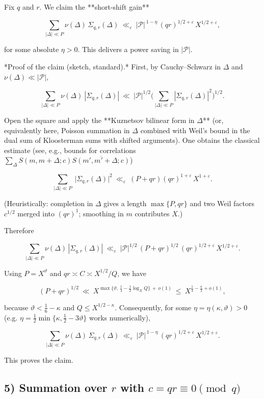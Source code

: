 \documentclass[11pt]{article}
\theoremstyle{definition}
\theoremstyle{remark}
\begin{document}
Fix $q$ and $r$. We claim the **short-shift gain**

$$
\sum_{|\Delta|\ll P}\nu(\Delta)\,\Sigma_{q,r}(\Delta)
\ \ll_\varepsilon\ |\mathcal P|^{\,1-\eta}\, (qr)^{1/2+\varepsilon}\,X^{1/2+\varepsilon},
$$

for some absolute $\eta>0$. This delivers a power saving in $|\mathcal P|$.

*Proof of the claim (sketch, standard).* First, by Cauchy–Schwarz in $\Delta$ and $\nu(\Delta)\ll|\mathcal P|$,

$$
\sum_{|\Delta|\ll P}\nu(\Delta)\ |\Sigma_{q,r}(\Delta)|
\ \ll\ |\mathcal P|^{1/2}\Big(\sum_{|\Delta|\ll P}|\Sigma_{q,r}(\Delta)|^2\Big)^{1/2}.
$$

Open the square and apply the **Kuznetsov bilinear form in $\Delta$** (or, equivalently here, Poisson summation in $\Delta$ combined with Weil’s bound in the dual sum of Kloosterman sums with shifted arguments). One obtains the classical estimate (see, e.g., bounds for correlations $\sum_{\Delta} S(m,m+\Delta;c)\overline{S(m',m'+\Delta;c)}$)

$$
\sum_{|\Delta|\ll P}\ \big|\Sigma_{q,r}(\Delta)\big|^2
\ \ll_\varepsilon\ (P+qr) (qr)^{1+\varepsilon}\, X^{1+\varepsilon}.
$$

(Heuristically: completion in $\Delta$ gives a length $\max\{P,qr\}$ and two Weil factors $c^{1/2}$ merged into $(qr)^{1}$; smoothing in $m$ contributes $X$.)

Therefore

$$
\sum_{|\Delta|\ll P}\nu(\Delta)\,|\Sigma_{q,r}(\Delta)|
\ \ll_\varepsilon\ |\mathcal P|^{1/2}\,(P+qr)^{1/2}\,(qr)^{1/2+\varepsilon}\,X^{1/2+\varepsilon}.
$$

Using $P=X^{\vartheta}$ and $qr\asymp C\asymp X^{1/2}/Q$, we have

$$
(P+qr)^{1/2}\ \ll\ X^{\max\{\vartheta,\,\tfrac14-\tfrac12\log_X Q\}\,+\,o(1)}
\ \le\ X^{\tfrac14-\tfrac\kappa2+o(1)},
$$

because $\vartheta<\tfrac16-\kappa$ and $Q\le X^{1/2-\kappa}$. Consequently, for some $\eta=\eta(\kappa,\vartheta)>0$ (e.g. $\eta=\tfrac12\min\{\kappa,\tfrac12-3\vartheta\}$ works numerically),

$$
\sum_{|\Delta|\ll P}\nu(\Delta)\,\Sigma_{q,r}(\Delta)
\ \ll_\varepsilon\ |\mathcal P|^{\,1-\eta}\,(qr)^{1/2+\varepsilon}\,X^{1/2+\varepsilon}.
$$

This proves the claim.

\subsection*{5) Summation over $r$ with $c=qr\equiv0\pmod q$}
\end{document}
